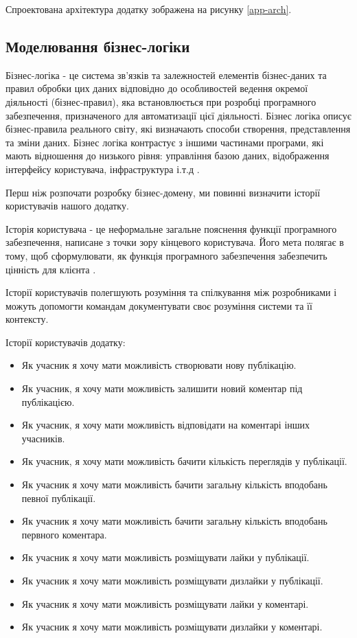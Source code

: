 Спроектована архітектура додатку зображена на рисунку \ref{app-arch}.

\subsection{Моделювання бізнес-логіки}

Бізнес-логіка - це система зв'язків та залежностей елементів бізнес-даних
та правил обробки цих даних відповідно до особливостей ведення окремої діяльності (бізнес-правил),
яка встановлюється при розробці програмного забезпечення,
призначеного для автоматизації цієї діяльності. Бізнес логіка описує бізнес-правила реального світу,
які визначають способи створення, представлення та зміни даних.
Бізнес логіка контрастує з іншими частинами програми,
які мають відношення до низького рівня: управління базою даних,
відображення інтерфейсу користувача, інфраструктура і.т.д \cite{business-def}.

Перш ніж розпочати розробку бізнес-домену, ми повинні визначити
історії користувачів нашого додатку.

Історія користувача - це неформальне загальне пояснення функції
програмного забезпечення, написане з точки зору кінцевого користувача.
Його мета полягає в тому, щоб сформулювати, як функція програмного
забезпечення забезпечить цінність для клієнта \cite{user-story-article}.

Історії користувачів полегшують розуміння та спілкування між розробниками і можуть допомогти командам
документувати своє розуміння системи та її контексту.

Історії користувачів додатку:
\begin{itemize}
		\item Як учасник я хочу мати можливість створювати нову публікацію.
		\item Як учасник, я хочу мати можливість залишити новий коментар під публікацією.
		\item Як учасник, я хочу мати можливість відповідати на коментарі інших учасників.
		\item Як учасник, я хочу мати можливість бачити кількість переглядів у публікації.
		\item Як учасник я хочу мати можливість бачити загальну кількість вподобань певної публікації.
		\item Як учасник я хочу мати можливість бачити загальну кількість вподобань первного коментара.
		\item Як учасник я хочу мати можливість розміщувати лайки у публікації.
		\item Як учасник я хочу мати можливість розміщувати дизлайки у публікації.
		\item Як учасник я хочу мати можливість розміщувати лайки у коментарі.
		\item Як учасник я хочу мати можливість розміщувати дизлайки у коментарі.
\end{itemize}

